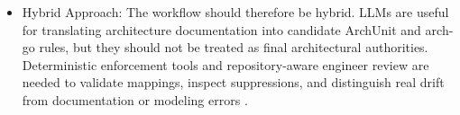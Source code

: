\documentclass[sigconf,screen]{acmart}
\begin{document}
\begin{itemize}
\begin{itemize}
        \item A zero-violation baseline is necessary but not sufficient. It must be interpreted with the fix history, because a suite can pass by using broad suppressions or overly permissive mappings.
        \item Pull request detection is suite-dependent. ZooKeeper PR-2307 failed under \texttt{claude-sonnet-4-6} but passed under \texttt{gemini-3-flash}, showing that independently generated rule suites are not interchangeable even when they come from the same architecture documentation.
    \end{itemize}
    \item Hybrid Approach: The workflow should therefore be hybrid. LLMs are useful for translating architecture documentation into candidate ArchUnit and arch-go rules, but they should not be treated as final architectural authorities. Deterministic enforcement tools and repository-aware engineer review are needed to validate mappings, inspect suppressions, and distinguish real drift from documentation or modeling errors \cite{schindler2024,su2026evaluating}.
\end{itemize}
\end{document}
